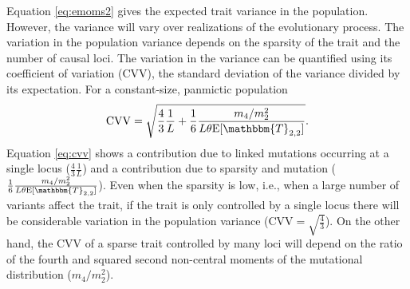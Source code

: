 Equation \eqref{eq:emoms2} gives the expected trait variance in the population.
However, the variance will vary over realizations of the evolutionary process.
The variation in the population variance depends on the sparsity of the trait
and the number of causal loci. The variation in the variance can be quantified
using its coefficient of variation (CVV), the standard deviation of the variance
divided by its expectation. For a constant-size, panmictic population
\begin{equation}
  \label{eq:cvv}
  \mathrm{CVV} = \sqrt{\frac{4}{3}\frac{1}{L} +
    \frac{1}{6}\frac{m_4/m_2^2}{L\theta \E[\mathbbm{T}_{2,2}]}}.
\end{equation}
Equation \eqref{eq:cvv} shows a contribution due to linked mutations occurring
at a single locus ($\frac{4}{3}\frac{1}{L}$) and a contribution due to sparsity
and mutation ($\frac{1}{6}\frac{m_4/m_2^2}{L\theta \E[\mathbbm{T}_{2,2}]}$).
Even when the sparsity is low, i.e., when a large number of variants affect the
trait, if the trait is only controlled by a single locus there will be
considerable variation in the population variance (CVV$=\sqrt{\frac{4}{3}}$). On
the other hand, the CVV of a sparse trait controlled by many loci will depend on
the ratio of the fourth and squared second non-central moments of the mutational
distribution ($m_4/m_2^2$).
